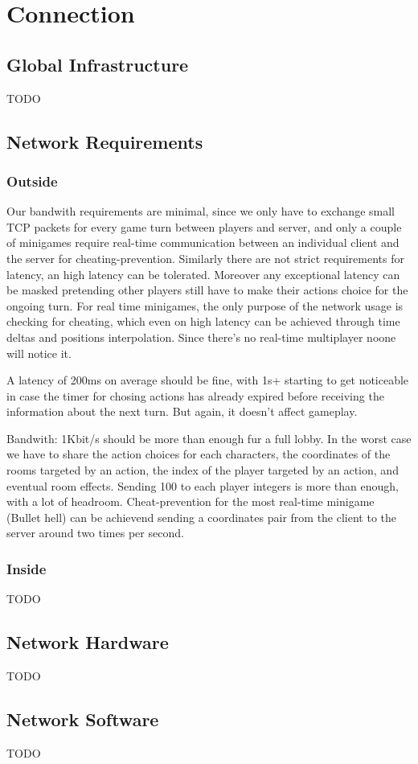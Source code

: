 \section{Connection}

\subsection{Global Infrastructure}
TODO

\subsection{Network Requirements}

\subsubsection{Outside}
Our bandwith requirements are minimal, since we only have to exchange small TCP packets for every game turn between players and server, and only a couple of minigames require real-time communication between an individual client and the server for cheating-prevention.
Similarly there are not strict requirements for latency, an high latency can be tolerated. Moreover any exceptional latency can be masked pretending other players still have to make their actions choice for the ongoing turn. For real time minigames, the only purpose of the network usage is checking for cheating, which even on high latency can be achieved through time deltas and positions interpolation. Since there's no real-time multiplayer noone will notice it.

A latency of 200ms on average should be fine, with 1s+ starting to get noticeable in case the timer for chosing actions has already expired before receiving the information about the next turn. But again, it doesn't affect gameplay.

Bandwith: 1Kbit/s should be more than enough fur a full lobby. In the worst case we have to share the action choices for each characters, the coordinates of the rooms targeted by an action, the index of the player targeted by an action, and eventual room effects. Sending 100 to each player integers is more than enough, with a lot of headroom. Cheat-prevention for the most real-time minigame (Bullet hell) can be achievend sending a coordinates pair from the client to the server around two times per second.



\subsubsection{Inside}
TODO

\subsection{Network Hardware}
TODO

\subsection{Network Software}
TODO

\pagebreak 